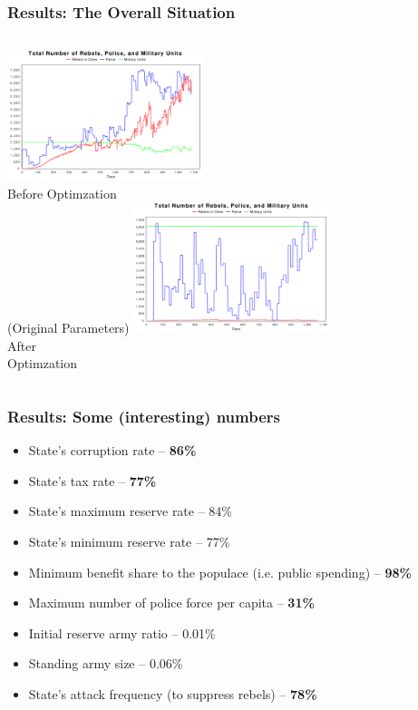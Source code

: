 \documentclass{beamer}
\begin{document}
\begin{frame}	
	\frametitle{Results: The Overall Situation}
	\begin{columns}[c]
	\column{2.5in}
		\centering
		\includegraphics[width=2.25in,keepaspectratio]{situation-old.pdf}\\
		Before Optimzation \\(Original Parameters)
	\column{2.5in}
		\centering
		\includegraphics[width=2.25in,keepaspectratio]{situation-new.pdf}\\
		After\\ Optimzation
	\end{columns}
\end{frame}
\begin{frame}
	\frametitle{Results: Some (interesting) numbers}
	\begin{itemize}
		\item State's corruption rate -- \textbf{86\%} 
		\item State's tax rate -- \textbf{77\%}
		\item State's maximum reserve rate -- 84\%
		\item State's minimum reserve rate -- 77\%
		\item Minimum benefit share to the populace (i.e. public spending) -- \textbf{98\%}
		\item Maximum number of police force per capita -- \textbf{31\%}
		\item Initial reserve army ratio -- 0.01\%
		\item Standing army size -- 0.06\%
		\item State's attack frequency (to suppress rebels) -- \textbf{78\%}
	\end{itemize}
\end{frame}
\end{document}
